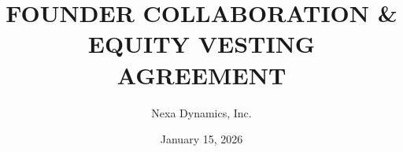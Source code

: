 \documentclass[11pt,letterpaper]{article}
\title{\sffamily\bfseries FOUNDER COLLABORATION \& EQUITY VESTING AGREEMENT}
\author{Nexa Dynamics, Inc.}
\date{January 15, 2026}
\begin{document}









\clearpage
\nocite{*}


\end{document}
